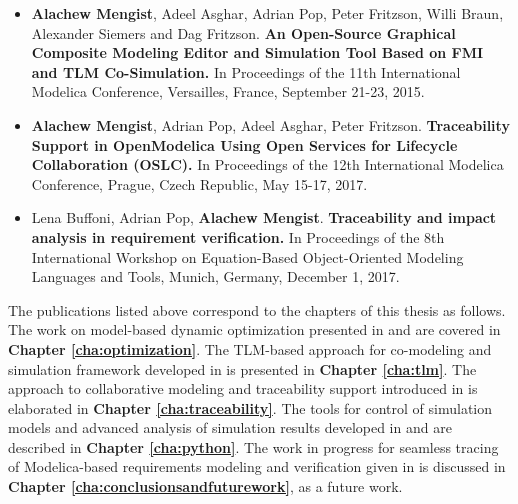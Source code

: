 \begin{itemize}
\item[\begin{NoHyper} \cite{alachewtlm} \end{NoHyper}] \textbf{Alachew Mengist}, Adeel Asghar, Adrian Pop, Peter Fritzson, Willi Braun, Alexander Siemers and Dag Fritzson.\textbf{ An Open-Source Graphical Composite Modeling Editor and Simulation Tool Based on FMI and TLM Co-Simulation.} In Proceedings of the 11th International Modelica Conference, Versailles, France, September 21-23, 2015. 


\item[\begin{NoHyper} \cite{alachewtraceability} \end{NoHyper}] \textbf{Alachew Mengist}, Adrian Pop, Adeel Asghar, Peter Fritzson. \textbf{Traceability Support in OpenModelica Using Open Services for Lifecycle Collaboration (OSLC).} In Proceedings of the 12th International Modelica Conference, Prague, Czech Republic, May 15-17, 2017. 

\item[\begin{NoHyper} \cite{alachewrequirementstraceability} \end{NoHyper}] Lena Buffoni, Adrian Pop, \textbf{Alachew Mengist}. \textbf{Traceability and impact analysis in requirement verification.} In Proceedings of the 8th International Workshop on Equation-Based Object-Oriented Modeling Languages and Tools, Munich, Germany, December 1, 2017. 

\end{itemize}

The publications listed above correspond to the chapters of this thesis as follows. The work on model-based dynamic optimization presented in \cite{alachewoptimization} and \cite{alachewoptimizationdemo} are covered in \textbf{Chapter \ref{cha:optimization}}. The TLM-based approach for co-modeling and simulation framework developed in \cite{alachewtlm} is presented in \textbf{Chapter \ref{cha:tlm}}. The approach to collaborative modeling and traceability support introduced in \cite{alachewtraceability} is elaborated in \textbf{Chapter \ref{cha:traceability}}. The tools for control of simulation models and advanced analysis of simulation results developed in \cite{alachewompython} and \cite{alachewpysimulator} are described in \textbf{Chapter \ref{cha:python}}. The work in progress for seamless tracing of Modelica-based requirements modeling and verification given in \cite{alachewrequirementstraceability} is discussed in \textbf{Chapter \ref{cha:conclusionsandfuturework}}, as a future work.


